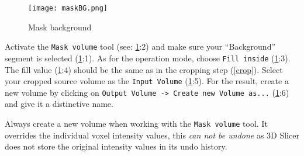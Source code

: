 \pagebreak
\begin{figure}[h!]
	\centerline{
		\texttt{[image: maskBG.png]}}
	  \caption{Mask background}
	  \label{fig:mBG}
	\end{figure}
\noindent
Activate the \texttt{Mask volume} tool (see: \cref{fig:mBG}:2) and make sure your ``Background'' segment is selected (\cref{fig:mBG}:1).
As for the operation mode, choose \texttt{Fill inside} (\cref{fig:mBG}:3).
The fill value (\cref{fig:mBG}:4) should be the same as in the cropping step (\cref{crop}).
Select your cropped source volume as the \texttt{Input Volume} (\cref{fig:mBG}:5).
For the result, create a new volume by clicking on \texttt{Output Volume -> Create new Volume as...} (\cref{fig:mBG}:6) and give it a distinctive name.
\newline %
\newline
\begin{minipage}{0.4\textwidth}
  \begin{center}
	
\end{center}
\end{minipage}%
%
\begin{minipage}{0.5\textwidth}
  Always create a new volume when working with the \texttt{Mask volume} tool.
  It overrides the individual voxel intensity values, this \emph{can not be undone} as 3D Slicer does not store the original intensity values in its undo history.
\end{minipage}
\newline
\newline %
\pagebreak

